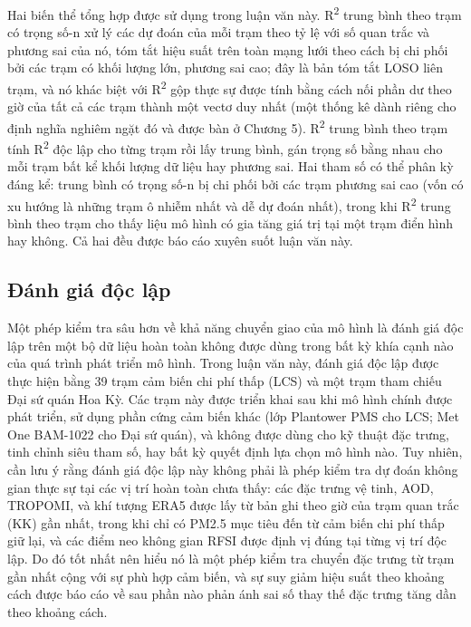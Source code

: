 Hai biến thể tổng hợp được sử dụng trong luận văn này. R\textsuperscript{2} trung bình theo trạm có trọng số-n xử lý các dự đoán của mỗi trạm theo tỷ lệ với số quan trắc và phương sai của nó, tóm tắt hiệu suất trên toàn mạng lưới theo cách bị chi phối bởi các trạm có khối lượng lớn, phương sai cao; đây là bản tóm tắt LOSO liên trạm, và nó khác biệt với R\textsuperscript{2} gộp thực sự được tính bằng cách nối phần dư theo giờ của tất cả các trạm thành một vectơ duy nhất (một thống kê dành riêng cho định nghĩa nghiêm ngặt đó và được bàn ở Chương 5). R\textsuperscript{2} trung bình theo trạm tính R\textsuperscript{2} độc lập cho từng trạm rồi lấy trung bình, gán trọng số bằng nhau cho mỗi trạm bất kể khối lượng dữ liệu hay phương sai. Hai tham số có thể phân kỳ đáng kể: trung bình có trọng số-n bị chi phối bởi các trạm phương sai cao (vốn có xu hướng là những trạm ô nhiễm nhất và dễ dự đoán nhất), trong khi R\textsuperscript{2} trung bình theo trạm cho thấy liệu mô hình có gia tăng giá trị tại một trạm điển hình hay không. Cả hai đều được báo cáo xuyên suốt luận văn này.

\subsection{Đánh giá độc lập}

Một phép kiểm tra sâu hơn về khả năng chuyển giao của mô hình là đánh giá độc lập trên một bộ dữ liệu hoàn toàn không được dùng trong bất kỳ khía cạnh nào của quá trình phát triển mô hình. Trong luận văn này, đánh giá độc lập được thực hiện bằng 39 trạm cảm biến chi phí thấp (LCS) và một trạm tham chiếu Đại sứ quán Hoa Kỳ. Các trạm này được triển khai sau khi mô hình chính được phát triển, sử dụng phần cứng cảm biến khác (lớp Plantower PMS cho LCS; Met One BAM-1022 cho Đại sứ quán), và không được dùng cho kỹ thuật đặc trưng, tinh chỉnh siêu tham số, hay bất kỳ quyết định lựa chọn mô hình nào. Tuy nhiên, cần lưu ý rằng đánh giá độc lập này không phải là phép kiểm tra dự đoán không gian thực sự tại các vị trí hoàn toàn chưa thấy: các đặc trưng vệ tinh, AOD, TROPOMI, và khí tượng ERA5 được lấy từ bản ghi theo giờ của trạm quan trắc (KK) gần nhất, trong khi chỉ có PM2.5 mục tiêu đến từ cảm biến chi phí thấp giữ lại, và các điểm neo không gian RFSI được định vị đúng tại từng vị trí độc lập. Do đó tốt nhất nên hiểu nó là một phép kiểm tra chuyển đặc trưng từ trạm gần nhất cộng với sự phù hợp cảm biến, và sự suy giảm hiệu suất theo khoảng cách được báo cáo về sau phần nào phản ánh sai số thay thế đặc trưng tăng dần theo khoảng cách.

